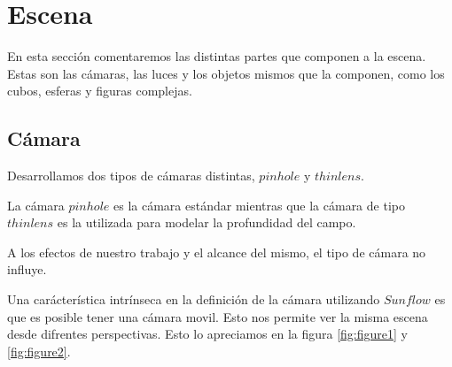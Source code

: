 \documentclass[a4paper,10pt]{article}
\begin{document}
\section{Escena}
\label{escena}
En esta secci\'on comentaremos las distintas partes que componen a la escena. 
Estas son las c\'amaras, las luces y los objetos mismos que la componen, como
los cubos, esferas y figuras complejas.

\subsection{C\'amara}

Desarrollamos dos tipos de c\'amaras distintas, $pinhole$ y $thinlens$.

La c\'amara $pinhole$ es la c\'amara est\'andar mientras que la c\'amara de
tipo $thinlens$ es la utilizada para modelar la profundidad del campo.

A los efectos de nuestro trabajo y el alcance del mismo, el tipo de c\'amara no
influye.

Una car\'acter\'istica intr\'inseca en la definici\'on de la c\'amara
utilizando $Sunflow$ es que es posible tener una c\'amara movil.  Esto nos
permite ver la misma escena desde difrentes perspectivas.  Esto lo apreciamos
en la figura \ref{fig:figure1} y \ref{fig:figure2}.
\end{document}
